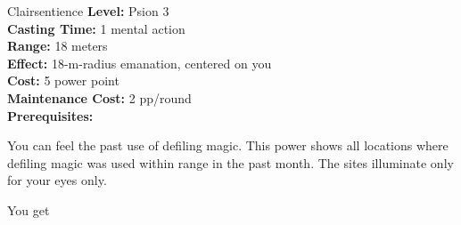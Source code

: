 {Clairsentience}
{
	\textbf{Level:}
	Psion 3\\
	\textbf{Casting Time:}
	1 mental action\\
	\textbf{Range:}
	18 meters\\
	\textbf{Effect:}
	18-m-radius emanation, centered on you\\
	\textbf{Cost:}
	5 power point\\
	\textbf{Maintenance Cost:}
	2 pp/round\\
	\textbf{Prerequisites:}
	\\
}
{
	You can feel the past use of defiling magic. This power shows all locations where defiling magic was used within range in the past month. The sites illuminate only for your eyes only.

	You get 
}